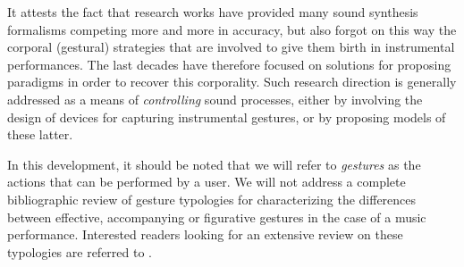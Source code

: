 {{It attests the fact that research works have provided many sound synthesis formalisms competing more and more in accuracy, but also forgot on this way the corporal (gestural) strategies that are involved to give them birth in instrumental performances. The last decades have therefore focused on solutions for proposing paradigms in order to recover this corporality. Such research direction is generally addressed as a means of \emph{controlling} sound processes, either by involving the design of devices for capturing instrumental gestures, or by proposing models of these latter.

In this development, it should be noted that we will refer to \emph{gestures} as the actions that can be performed by a user. We will not address a complete bibliographic review of gesture typologies for characterizing the differences between effective, accompanying or figurative gestures in the case of a music performance. Interested readers looking for an extensive review on these typologies are referred to . %


}}
